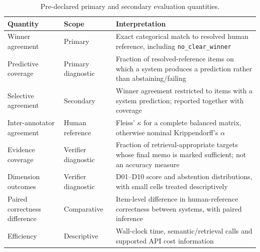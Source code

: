 \begin{table}[htbp]
\centering
\footnotesize
\setlength{\tabcolsep}{4pt}
\renewcommand{\arraystretch}{1.08}
\caption{Pre-declared primary and secondary evaluation quantities.}
\label{tab:evaluation-metrics}
\begin{tabularx}{\textwidth}{p{3.5cm}p{3.2cm}X}
\toprule
\textbf{Quantity} & \textbf{Scope} & \textbf{Interpretation} \\
\midrule
Winner agreement & Primary & Exact categorical match to resolved human reference, including \texttt{no\_clear\_winner} \\
Predictive coverage & Primary diagnostic & Fraction of resolved-reference items on which a system produces a prediction rather than abstaining/failing \\
Selective agreement & Secondary & Winner agreement restricted to items with a system prediction; reported together with coverage \\
Inter-annotator agreement & Human reference & Fleiss' $\kappa$ for a complete balanced matrix, otherwise nominal Krippendorff's $\alpha$ \\
Evidence coverage & Verifier diagnostic & Fraction of retrieval-appropriate targets whose final memo is marked sufficient; not an accuracy measure \\
Dimension outcomes & Verifier diagnostic & D01--D10 score and abstention distributions, with small cells treated descriptively \\
Paired correctness difference & Comparative & Item-level difference in human-reference correctness between systems, with paired inference \\
Efficiency & Descriptive & Wall-clock time, semantic/retrieval calls and supported API cost information \\
\bottomrule
\end{tabularx}
\end{table}
